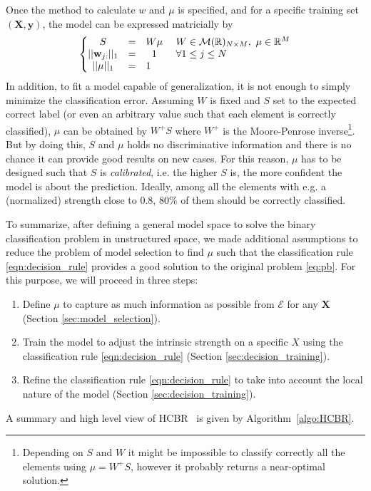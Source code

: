\documentclass[preprint,12pt]{elsarticle}
\def\HCBR{{\sc HCBR}}
\theoremstyle{definition}
\begin{document}
Once the method to calculate $w$ and $\mu$ is specified, and for a specific training set $(\mathbf X, \mathbf y)$, the model can be expressed matricially by
\begin{align}
\label{eqn:model_mat}
\left\{\begin{matrix}
S & = & W \mu &~ W \in \mathcal{M}(\mathbb{R})_{N \times M}, ~ \mu \in \mathbb{R}^M \\
||\mathbf{w}_{j:}||_1 & = & 1 & ~ \forall 1 \leq j \leq N \hfill\\%
||\mu||_1 & = & 1  \hfill
\end{matrix}\right.
\end{align}
In addition, to fit a model capable of generalization, it is not enough to simply minimize the classification error. Assuming $W$ is fixed and $S$ set to the expected correct label (or even an arbitrary value such that each element is correctly classified), $\mu$ can be obtained by $W^+S$ where $W^+$ is the Moore-Penrose inverse\footnote{Depending on $S$ and $W$ it might be impossible to classify correctly all the elements using $\mu = W^+S$, however it probably returns a near-optimal solution.}. But by doing this, $S$ and $\mu$ holds no discriminative information and there is no chance it can provide good results on new cases. For this reason, $\mu$ has to be designed such that $S$ is {\it calibrated}, i.e. the higher $S$ is, the more confident the model is about the prediction. Ideally, among all the elements with e.g. a (normalized) strength close to 0.8, 80\% of them should be correctly classified. 

To summarize, after defining a general model space to solve the binary classification problem in unstructured space, we made additional assumptions to reduce the problem of model selection to find $\mu$ such that the classification rule \eqref{eqn:decision_rule} provides a good solution to the original problem \eqref{eq:pb}. For this purpose, we will proceed in three steps:

  \begin{enumerate}
  \item Define $\mu$ to capture as much information as possible from $\mathcal E$ for any $\mathbf X$ (Section \ref{sec:model_selection}).
  \item Train the model to adjust the intrinsic strength on a specific $X$ using the classification rule \eqref{eqn:decision_rule} (Section \ref{sec:decision_training}).
  \item Refine the classification rule \eqref{eqn:decision_rule} to take into account the local nature of the model (Section \ref{sec:decision_training}).
  \end{enumerate} A summary and high level view of \HCBR~ is given by Algorithm~\ref{algo:HCBR}.
\end{document}

